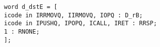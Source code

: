 \documentclass{article}
\begin{document}
\texttt{word d\_dstE = [ \\
\hspace*{17mm}icode in {IRRMOVQ, IIRMOVQ, IOPQ} : D\_rB; \\
\hspace*{17mm}icode in {IPUSHQ, IPOPQ, ICALL, IRET} : RRSP; \\
\hspace*{17mm}1 : RNONE; \\
\hspace*{5mm}];}
\end{document}
